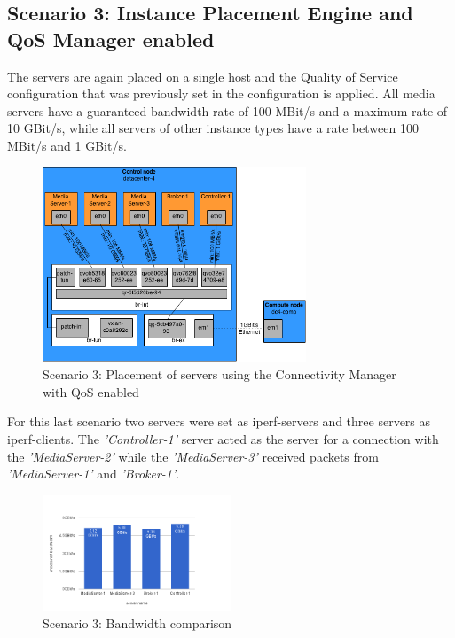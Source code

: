 \subsection{Scenario 3: Instance Placement Engine and QoS Manager enabled}

The servers are again placed on a single host and the Quality of Service configuration that was previously set in the configuration is applied. All media servers have a guaranteed bandwidth rate of 100 MBit/s and a maximum rate of 10 GBit/s, while all servers of other instance types have a rate between 100 MBit/s and 1 GBit/s.

\begin{figure}[H]
\centering

\includegraphics[width=0.7\textwidth]{images/evaluation/testbed_scenario3}

\caption{Scenario 3: Placement of servers using the Connectivity Manager with QoS enabled}
\end{figure}

For this last scenario two servers were set as iperf-servers and three servers as iperf-clients. The \textit{'Controller-1'} server acted as the server for a connection with the \textit{'MediaServer-2'} while the \textit{'MediaServer-3'} received packets from \textit{'MediaServer-1'} and \textit{'Broker-1'}.

\begin{figure}[H]
\centering

\includegraphics[width=0.5\textwidth]{images/evaluation/testbed_scenario2_bw}

\caption{Scenario 3: Bandwidth comparison}
\end{figure}

